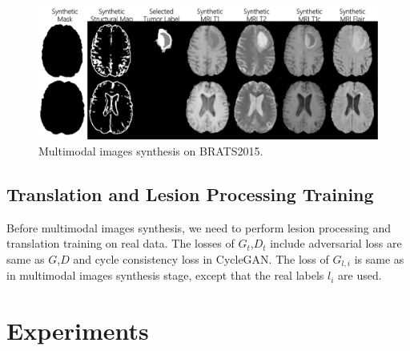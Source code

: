 \documentclass[runningheads]{llncs}
\begin{document}
	\begin{figure}[th]
		\centering
		\includegraphics[width=0.7\linewidth]{figures/F_to_MRI}
		\caption{Multimodal images synthesis on BRATS2015.}
		\label{generated_mri}
	\end{figure}
	\subsection{Translation and Lesion Processing Training}
	Before multimodal images synthesis, we need to perform lesion processing and translation training on real data. The losses of $G_t$,$D_t$ include adversarial loss are same as $G$,$D$ and cycle consistency loss in CycleGAN.
	The loss of $G_{l,i}$ is same as in multimodal images synthesis stage, except that the real labels $l_i$ are used.
	\section{Experiments}
\end{document}
